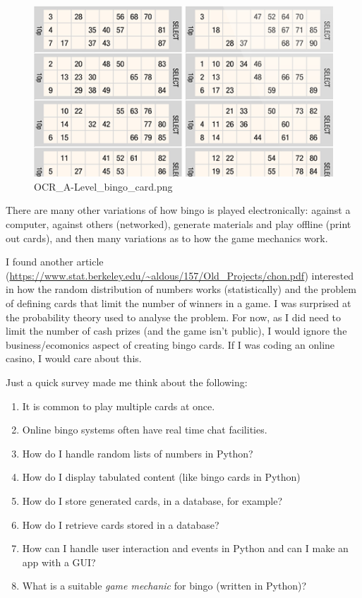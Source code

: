 \documentclass[11pt]{article}
\makeatletter
\def\maxwidth{\ifdim\Gin@nat@width>\linewidth\linewidth
    \else\Gin@nat@width\fi}
\let\Oldincludegraphics\includegraphics
\renewcommand{\includegraphics}[1]{\Oldincludegraphics[width=.8\maxwidth]{#1}}
\providecommand{\tightlist}{%
      \setlength{\itemsep}{0pt}\setlength{\parskip}{0pt}}
\makeatother
\begin{document}
\begin{figure}
\centering
\includegraphics{OCR_A-Level_bingo_card.png}
\caption{OCR\_A-Level\_bingo\_card.png}
\end{figure}

There are many other variations of how bingo is played electronically:
against a computer, against others (networked), generate materials and
play offline (print out cards), and then many variations as to how the
game mechanics work.

I found another article
(\url{https://www.stat.berkeley.edu/~aldous/157/Old_Projects/chon.pdf})
interested in how the random distribution of numbers works
(statistically) and the problem of defining cards that limit the number
of winners in a game. I was surprised at the probability theory used to
analyse the problem. For now, as I did need to limit the number of cash
prizes (and the game isn't public), I would ignore the
business/ecomonics aspect of creating bingo cards. If I was coding an
online casino, I would care about this.

Just a quick survey made me think about the following:

\begin{enumerate}
\def\labelenumi{\arabic{enumi}.}
\tightlist
\item
  It is common to play multiple cards at once.
\item
  Online bingo systems often have real time chat facilities.
\item
  How do I handle random lists of numbers in Python?
\item
  How do I display tabulated content (like bingo cards in Python)
\item
  How do I store generated cards, in a database, for example?
\item
  How do I retrieve cards stored in a database?
\item
  How can I handle user interaction and events in Python and can I make
  an app with a GUI?
\item
  What is a suitable \emph{game mechanic} for bingo (written in Python)?
\end{enumerate}
\end{document}
